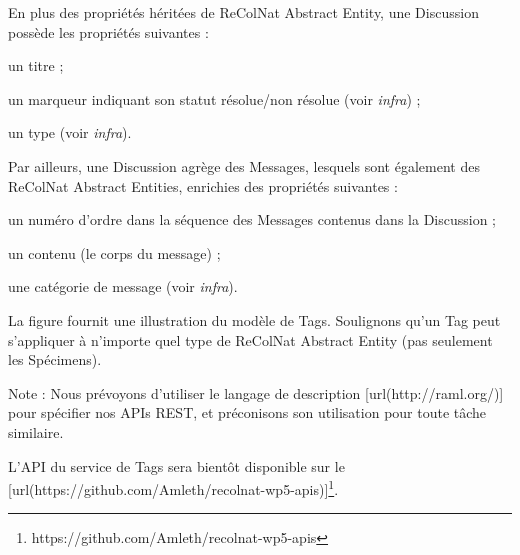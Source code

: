 

\startsection[title={Présentation du modèle de Discussions},reference=mcs:disc]

En plus des propriétés héritées de ReColNat Abstract Entity, une Discussion possède les propriétés suivantes :

\startitemize
\item un titre ;
\item un marqueur indiquant son statut résolue/non résolue (voir {\em infra}) ;
\item un type (voir {\em infra}).
\stopitemize

Par ailleurs, une Discussion agrège des Messages, lesquels sont également des ReColNat Abstract Entities, enrichies des propriétés suivantes :

\startitemize
\item un numéro d'ordre dans la séquence des Messages contenus dans la Discussion ;
\item un contenu (le corps du message) ;
\item une catégorie de message (voir {\em infra}).
\stopitemize

\startsection[title={Présentation du modèle de Tags},reference=mcs:tags]

La figure  fournit une illustration du modèle de Tags.
Soulignons qu'un Tag peut s'appliquer à n'importe quel type de ReColNat Abstract Entity (pas seulement les Spécimens). 

\startsection[title={L'API du service de Tags}]

Note : Nous prévoyons d'utiliser le langage de description [url(http://raml.org/)] pour spécifier nos APIs REST, et préconisons son utilisation pour toute tâche similaire.

L'API du service de Tags sera bientôt disponible sur le [url(https://github.com/Amleth/recolnat-wp5-apis)]\footnote{https://github.com/Amleth/recolnat-wp5-apis}.
